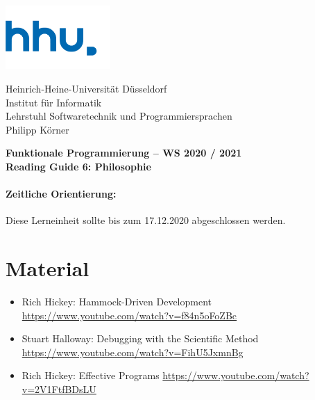 \documentclass[11pt,a4paper]{article}
\theoremstyle{break}
\begin{document}
\begin{minipage}[b]{\textwidth}
\parbox[t]{5cm}{%
\includegraphics[width=4cm]{unilogo}
\hfill
}
\parbox[b]{11cm}{%
Heinrich-Heine-Universit\"at D\"usseldorf\\
Institut f\"ur Informatik\\
Lehrstuhl Softwaretechnik und Programmiersprachen\\
Philipp K\"orner
}

\end{minipage}
\begin{center}
\bf
Funktionale Programmierung -- WS 2020 / 2021\\
Reading Guide 6: Philosophie
\end{center}

\pagestyle{empty}

\paragraph{Zeitliche Orientierung:} Diese Lerneinheit sollte bis zum 17.12.2020 abgeschlossen werden.

\section{Material} 

\begin{itemize}
\item Rich Hickey: Hammock-Driven Development \url{https://www.youtube.com/watch?v=f84n5oFoZBc}
\item Stuart Halloway: Debugging with the Scientific Method \url{https://www.youtube.com/watch?v=FihU5JxmnBg}
\item Rich Hickey: Effective Programs \url{https://www.youtube.com/watch?v=2V1FtfBDsLU}
\end{itemize}
\end{document}
